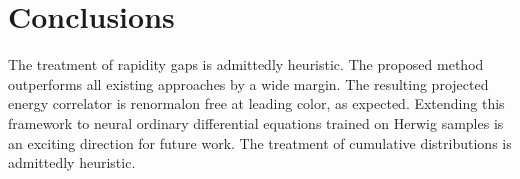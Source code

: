 \section{Conclusions}\label{sec:conclusions}

The treatment of rapidity gaps is admittedly heuristic. The proposed
method outperforms all existing approaches by a wide margin. The
resulting projected energy correlator is renormalon free at leading
color, as expected. Extending this framework to neural ordinary
differential equations trained on Herwig samples is an exciting
direction for future work. The treatment of cumulative distributions is
admittedly heuristic.

